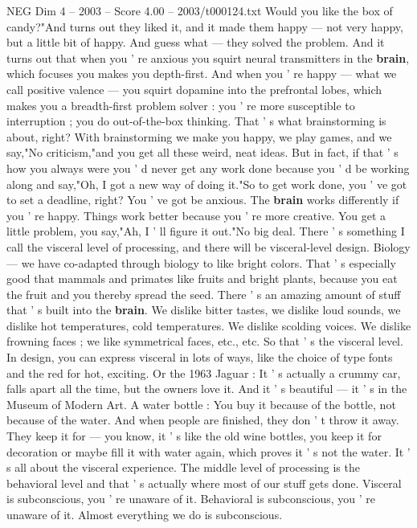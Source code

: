 \begin{textsample}{NEG Dim 4 – 2003 – Score 4.00 – 2003/t000124.txt}
Would you like the box of candy?"And turns out they liked it, and it made them happy — not very happy, but a little bit of happy.
And guess what — they solved the problem.
And it turns out that when you ' re anxious you squirt neural transmitters in the \textbf{brain}, which focuses you makes you depth-first.
And when you ' re happy — what we call positive valence — you squirt dopamine into the prefrontal lobes, which makes you a breadth-first problem solver : you ' re more susceptible to interruption ; you do out-of-the-box thinking.
That ' s what brainstorming is about, right?
With brainstorming we make you happy, we play games, and we say,"No criticism,"and you get all these weird, neat ideas.
But in fact, if that ' s how you always were you ' d never get any work done because you ' d be working along and say,"Oh, I got a new way of doing it."So to get work done, you ' ve got to set a deadline, right?
You ' ve got be anxious.
The \textbf{brain} works differently if you ' re happy.
Things work better because you ' re more creative.
You get a little problem, you say,"Ah, I ' ll figure it out."No big deal.
There ' s something I call the visceral level of processing, and there will be visceral-level design.
Biology — we have co-adapted through biology to like bright colors.
That ' s especially good that mammals and primates like fruits and bright plants, because you eat the fruit and you thereby spread the seed.
There ' s an amazing amount of stuff that ' s built into the \textbf{brain}.
We dislike bitter tastes, we dislike loud sounds, we dislike hot temperatures, cold temperatures.
We dislike scolding voices.
We dislike frowning faces ; we like symmetrical faces, etc., etc.
So that ' s the visceral level.
In design, you can express visceral in lots of ways, like the choice of type fonts and the red for hot, exciting.
Or the 1963 Jaguar : It ' s actually a crummy car, falls apart all the time, but the owners love it.
And it ' s beautiful — it ' s in the Museum of Modern Art.
A water bottle : You buy it because of the bottle, not because of the water.
And when people are finished, they don ' t throw it away.
They keep it for — you know, it ' s like the old wine bottles, you keep it for decoration or maybe fill it with water again, which proves it ' s not the water.
It ' s all about the visceral experience.
The middle level of processing is the behavioral level and that ' s actually where most of our stuff gets done.
Visceral is subconscious, you ' re unaware of it.
Behavioral is subconscious, you ' re unaware of it.
Almost everything we do is subconscious.

\end{textsample}
